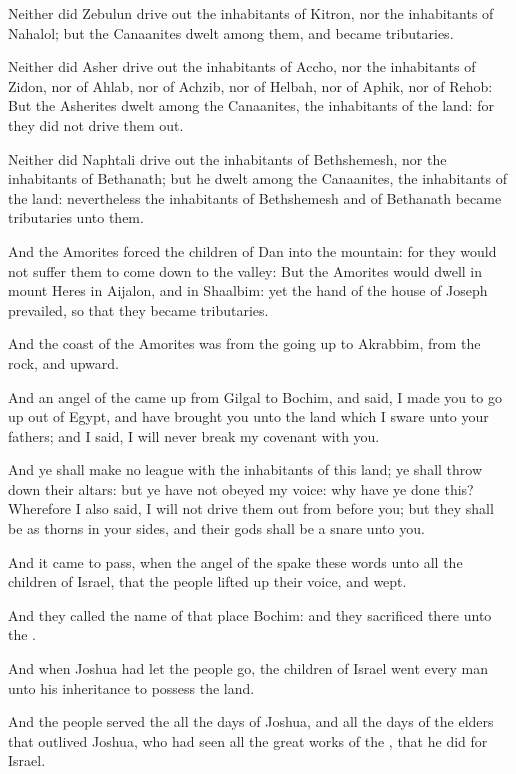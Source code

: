 \Verse Neither did Zebulun drive out the inhabitants of Kitron, nor the inhabitants of Nahalol; but the Canaanites dwelt among them, and became tributaries.

\Verse Neither did Asher drive out the inhabitants of Accho, nor the inhabitants of Zidon, nor of Ahlab, nor of Achzib, nor of Helbah, nor of Aphik, nor of Rehob: \Verse But the Asherites dwelt among the Canaanites, the inhabitants of the land: for they did not drive them out.

\Verse Neither did Naphtali drive out the inhabitants of Bethshemesh, nor the inhabitants of Bethanath; but he dwelt among the Canaanites, the inhabitants of the land: nevertheless the inhabitants of Bethshemesh and of Bethanath became tributaries unto them.

\Verse And the Amorites forced the children of Dan into the mountain: for they would not suffer them to come down to the valley: \Verse But the Amorites would dwell in mount Heres in Aijalon, and in Shaalbim: yet the hand of the house of Joseph prevailed, so that they became tributaries.

\Verse And the coast of the Amorites was from the going up to Akrabbim, from the rock, and upward.


\Chapter
\Verse And an angel of the \LORD came up from Gilgal to Bochim, and said, I made you to go up out of Egypt, and have brought you unto the land which I sware unto your fathers; and I said, I will never break my covenant with you.

\Verse And ye shall make no league with the inhabitants of this land; ye shall throw down their altars: but ye have not obeyed my voice: why have ye done this?  \Verse Wherefore I also said, I will not drive them out from before you; but they shall be as thorns in your sides, and their gods shall be a snare unto you.

\Verse And it came to pass, when the angel of the \LORD spake these words unto all the children of Israel, that the people lifted up their voice, and wept.

\Verse And they called the name of that place Bochim: and they sacrificed there unto the \LORD.

\Verse And when Joshua had let the people go, the children of Israel went every man unto his inheritance to possess the land.

\Verse And the people served the \LORD all the days of Joshua, and all the days of the elders that outlived Joshua, who had seen all the great works of the \LORD, that he did for Israel.

